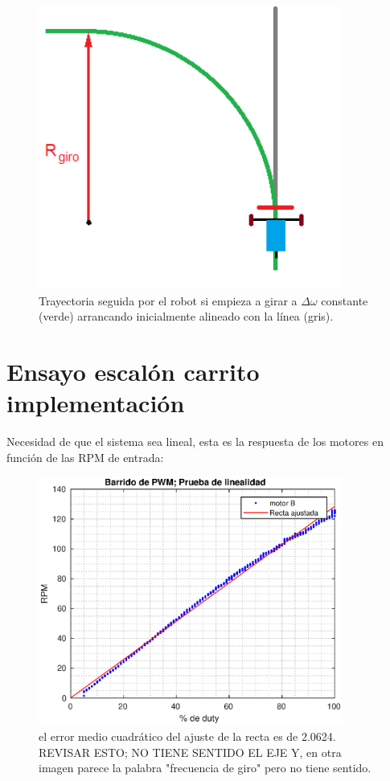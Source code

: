 \documentclass[10pt,conference,a4paper,onecolumn]{article}%
\begin{document}
\begin{figure}[h]
\centering
\includegraphics[width=10cm]{./imagenes/carrito_Ensayo_escalon.png}
\caption{Trayectoria seguida por el robot si empieza a girar a $\Delta \omega $ constante (verde) arrancando inicialmente alineado con la línea (gris).}
\label{fig:carritoEsc}
\end{figure}


\section{Ensayo escalón carrito implementación}

Necesidad de que el sistema sea lineal, esta es la respuesta de los motores en función de las RPM de entrada:

\begin{figure}[h]
\centering
\includegraphics[width=10cm]{./imagenes/prueba_linealidad}
\caption{el error medio cuadrático del ajuste de la recta es de 2.0624. REVISAR ESTO; NO TIENE SENTIDO EL EJE Y, en otra imagen parece la palabra "frecuencia de giro" pero no tiene sentido.}
\label{fig:prueba_linealidad}
\end{figure}
\end{document}
